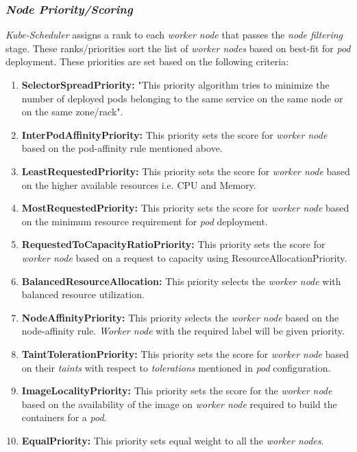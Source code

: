 \subsubsection{\emph{Node Priority/Scoring}}
\label{sec:node-priority}
\emph{Kube-Scheduler} assigns a rank to each \emph{worker node} that passes the \emph{node filtering} stage. These ranks/priorities sort the list of \emph{worker nodes} based on best-fit for \emph{pod} deployment. These priorities are set based on the following criteria\cite{k8s}:
\begin{enumerate}
  \item \textbf{SelectorSpreadPriority:} "This priority algorithm tries to minimize the number of deployed pods belonging to the same service on the same node or on the same zone/rack"\cite{Santos2019}.
  \item \textbf{InterPodAffinityPriority:} This priority sets the score for \emph{worker node} based on the pod-affinity rule mentioned above.
  \item \textbf{LeastRequestedPriority:} This priority sets the score for \emph{worker node} based on the higher available resources i.e. CPU and Memory.
  \item \textbf{MostRequestedPriority:} This priority sets the score for \emph{worker node} based on the minimum resource requirement for \emph{pod} deployment.
  \item \textbf{RequestedToCapacityRatioPriority:} This priority sets the score for \emph{worker node} based on a request to capacity using ResourceAllocationPriority.
  \item \textbf{BalancedResourceAllocation:} This priority selects the \emph{worker node} with balanced resource utilization.
  \item \textbf{NodeAffinityPriority:} This priority selects the \emph{worker node} based on the node-affinity rule. \emph{Worker node} with the required label will be given priority.
  \item \textbf{TaintTolerationPriority:} This priority sets the score for \emph{worker node} based on their \emph{taints} with respect to \emph{tolerations} mentioned in \emph{pod} configuration\cite{Santos2019}.
  \item \textbf{ImageLocalityPriority:} This priority sets the score for the \emph{worker node} based on the availability of the image on \emph{worker node} required to build the containers for a \emph{pod}.
  \item \textbf{EqualPriority:} This priority sets equal weight to all the \emph{worker nodes}.
\end{enumerate}
